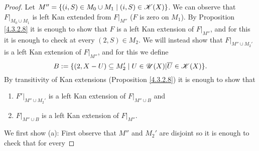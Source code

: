 \documentclass[../../thesis.tex]{subfiles}
\begin{document}
\begin{proof}
    Let $M''=\{(i,S) \in M_0 \cup M_1 \mid (i,S)\in \mathscr{K}(X)\}$.
    We can observe that $F|_{M_0 \cup M_1}$ is left Kan extended from $F|_{M''}$ ($F$ is zero on $M_1$).
    By Proposition \ref{4.3.2.8} it is enough to show that $F$ is a left Kan extension of $F|_{M''}$, and for this it is enough to check at every $(2,S) \in M_2$.
    We will instead show that $F|_{M'' \cup M_2'}$ is a left Kan extension of $F|_{M''}$, and for this we define
    \[B:=\{(2, X- U) \subseteq M_2' \mid U \in \mathscr{U}(X) | \overline{U} \in \mathscr{K}(X)\} .\]
    By transitivity of Kan extensions (Proposition \ref{4.3.2.8}) it is enough to show that
    \begin{enumerate}[label=(\alph*)]
        \item $F'|_{M'' \cup M_2'}$ is a left Kan extension of $F|_{M'' \cup B}$ and
        \item $F|_{M'' \cup B}$ is a left Kan extension of $F|_{M''}$.
    \end{enumerate}
    We first show (a):
    First observe that $M''$ and $M_2'$ are disjoint so it is enough to check that for every


\end{proof}
\end{document}
